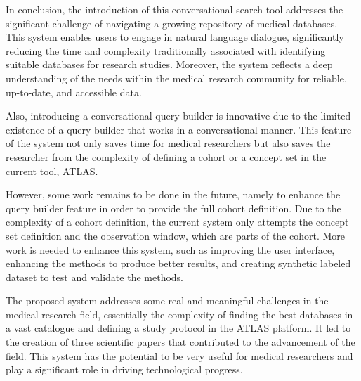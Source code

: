 In conclusion, the introduction of this conversational search tool addresses the significant challenge of navigating a growing repository of medical databases. This system enables users to engage in natural language dialogue, significantly reducing the time and complexity traditionally associated with identifying suitable databases for research studies. Moreover, the system reflects a deep understanding of the needs within the medical research community for reliable, up-to-date, and accessible data.

Also, introducing a conversational query builder is innovative due to the limited existence of a query builder that works in a conversational manner. This feature of the system not only saves time for medical researchers but also saves the researcher from the complexity of defining a cohort or a concept set in the current tool, ATLAS.

However, some work remains to be done in the future, namely to enhance the query builder feature in order to provide the full cohort definition. Due to the complexity of a cohort definition, the current system only attempts the concept set definition and the observation window, which are parts of the cohort. More work is needed to enhance this system, such as improving the user interface, enhancing the {\ir} methods to produce better results, and creating synthetic labeled dataset to test and validate the {\ir} methods.

The proposed system addresses some real and meaningful challenges in the medical research field, essentially the complexity of finding the best databases in a vast catalogue and defining a study protocol in the ATLAS platform. It led to the creation of three scientific papers that contributed to the advancement of the field. This system has the potential to be very useful for medical researchers and play a significant role in driving technological progress.
